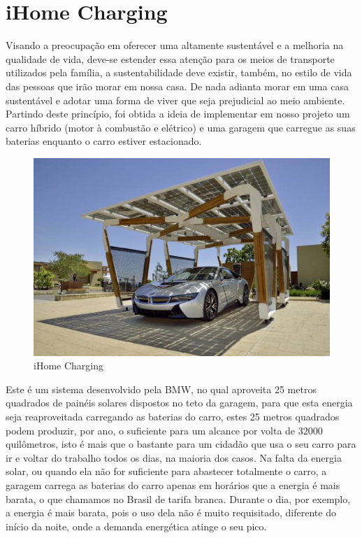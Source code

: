 \chapter{iHome Charging}

Visando a preocupação em oferecer uma altamente sustentável e a melhoria na qualidade de vida, deve-se estender essa atenção para os meios de transporte utilizados pela família, a sustentabilidade deve existir, também, no estilo de vida das pessoas que irão morar em nossa casa. De nada adianta morar em uma casa sustentável e adotar uma forma de viver que seja prejudicial ao meio ambiente. Partindo deste princípio, foi obtida a ideia de implementar em nosso projeto um carro híbrido (motor à combustão e elétrico) e uma garagem que carregue as suas baterias enquanto o carro estiver estacionado.

\begin{figure}[H]
\begin{center}
\includegraphics[keepaspectratio,scale=0.6]{figuras/ihomecharging.jpg.eps}
\caption{iHome Charging}
\end{center}
\end{figure}

Este é um sistema desenvolvido pela BMW, no qual aproveita 25 metros quadrados de painéis solares dispostos no teto da garagem, para que esta energia seja reaproveitada carregando as baterias do carro, estes 25 metros quadrados podem produzir, por ano, o suficiente para um alcance por volta de 32000 quilômetros, isto é mais que o bastante para um cidadão que usa o seu carro para ir e voltar do trabalho todos os dias, na maioria dos casos. Na falta da energia solar, ou quando ela não for suficiente para abastecer totalmente o carro, a garagem carrega as baterias do carro apenas em horários que a energia é mais barata, o que chamamos no Brasil de tarifa branca. Durante o dia, por exemplo, a energia é mais barata, pois o uso dela não é muito requisitado, diferente do início da noite, onde a demanda energética atinge o seu pico.

